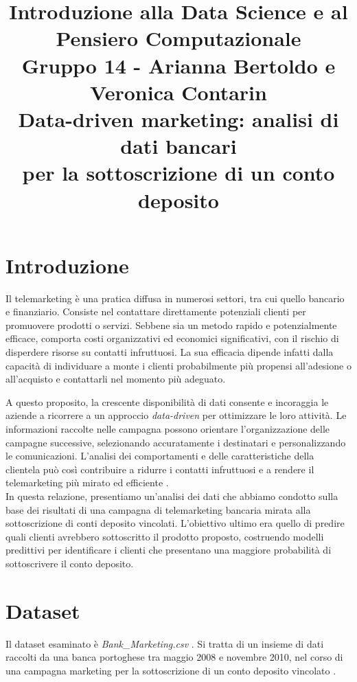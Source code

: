 \documentclass[11,5pt, a4paper]{article}
\title{\normalsize Introduzione alla Data Science e al Pensiero Computazionale \\[0.5em]
\normalsize Gruppo 14 - Arianna Bertoldo e Veronica Contarin \\[1.3 em]
\LARGE \textbf{Data-driven marketing: analisi di dati bancari \\ per la sottoscrizione di un conto deposito}}
\date{}
\author{}
\makeatletter
\let\oldtableofcontents\tableofcontents
\renewcommand{\tableofcontents}{\begingroup%
  \patchcmd{\@makeschapterhead}%
    {\vspace*{50\p@}}%
    {}%
    {}{}%
  \oldtableofcontents%
  \endgroup%
}
\makeatother
\begin{document}
 

\maketitle

\vspace{-5.6em}
\tableofcontents 

\section{Introduzione}

Il telemarketing è una pratica diffusa in numerosi settori, tra cui quello bancario e finanziario. Consiste nel contattare direttamente potenziali clienti per promuovere prodotti o servizi. 
Sebbene sia un metodo rapido e potenzialmente efficace, comporta costi organizzativi ed economici significativi, con il rischio di disperdere risorse su contatti infruttuosi. La sua efficacia dipende infatti dalla capacità di individuare a monte i clienti probabilmente più propensi all'adesione o all'acquisto e contattarli nel momento più adeguato.

A questo proposito, la crescente disponibilità di dati consente e incoraggia le aziende a ricorrere a un approccio \textit{data-driven} per ottimizzare le loro attività.
Le informazioni raccolte nelle campagna possono orientare l'organizzazione delle campagne successive, selezionando accuratamente i destinatari e personalizzando le comunicazioni. L'analisi dei comportamenti e delle caratteristiche della clientela può così contribuire a ridurre i contatti infruttuosi e a rendere il telemarketing più mirato ed efficiente \citep{ROSARIO2023}.
\\

In questa relazione, presentiamo un'analisi dei dati \citep{ariannab02}
che abbiamo condotto sulla base dei risultati di una campagna di telemarketing bancaria mirata alla sottoscrizione di conti deposito vincolati.  L'obiettivo ultimo era quello di predire quali clienti avrebbero sottoscritto il prodotto proposto, costruendo modelli predittivi per identificare i clienti che presentano una maggiore probabilità di sottoscrivere il conto deposito. 


\section{Dataset}

Il dataset esaminato è \textit{Bank\_Marketing.csv} \citep{BankMarketing}.
Si tratta di un insieme di dati raccolti da una banca portoghese tra maggio 2008 e novembre 2010, nel corso di una campagna marketing per la sottoscrizione di un conto deposito vincolato \citep{bank_marketing_222}.
\end{document}
